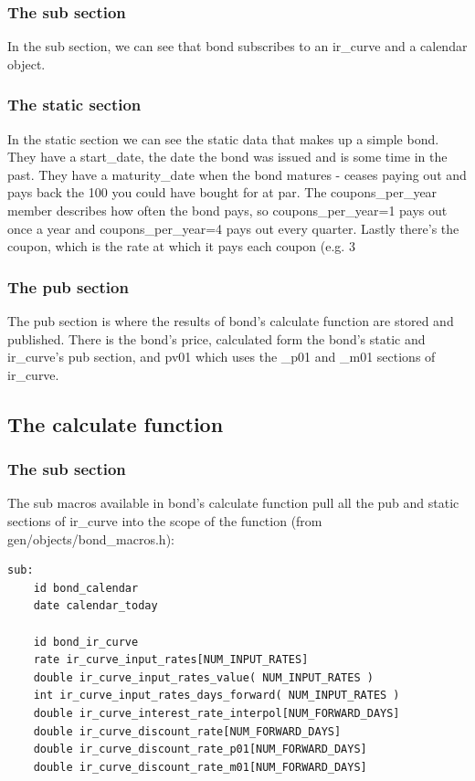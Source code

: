 \documentclass{report}
\begin{document}
\subsubsection{The sub section}

In the sub section, we can see that bond subscribes to an ir_curve and a calendar object.

\subsubsection{The static section}

In the static section we can see the static data that makes up a simple bond. They have a start_date, the date the bond was issued and is some time in the past. They have a maturity_date when the bond matures - ceases paying out and pays back the 100 you could have bought for at par. The coupons_per_year member describes how often the bond pays, so coupons_per_year=1 pays out once a year and coupons_per_year=4 pays out every quarter. Lastly there's the coupon, which is the rate at which it pays each coupon (e.g. 3%

\subsubsection{The pub section}

The pub section is where the results of bond's calculate function are stored and published. There is the bond's price, calculated form the bond's static and ir_curve's pub section, and pv01 which uses the _p01 and _m01 sections of ir_curve.

\subsection{The calculate function}

\subsubsection{The sub section}

The sub macros available in bond's calculate function pull all the pub and static sections of ir_curve into the scope of the function (from gen/objects/bond_macros.h):

\begin{verbatim}
sub:
    id bond_calendar
    date calendar_today

    id bond_ir_curve
    rate ir_curve_input_rates[NUM_INPUT_RATES]
    double ir_curve_input_rates_value( NUM_INPUT_RATES )
    int ir_curve_input_rates_days_forward( NUM_INPUT_RATES )
    double ir_curve_interest_rate_interpol[NUM_FORWARD_DAYS]
    double ir_curve_discount_rate[NUM_FORWARD_DAYS]
    double ir_curve_discount_rate_p01[NUM_FORWARD_DAYS]
    double ir_curve_discount_rate_m01[NUM_FORWARD_DAYS]
\end{verbatim}
\end{document}
